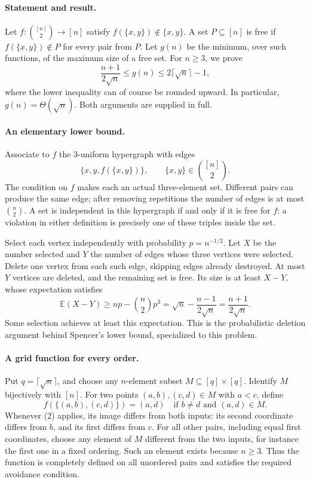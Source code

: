 \paragraph{Statement and result.}
Let \(f:\binom{[n]}2\to[n]\) satisfy \(f(\{x,y\})\notin\{x,y\}\). A set \(P\subseteq[n]\) is free if \(f(\{x,y\})\notin P\) for every pair from \(P\). Let \(g(n)\) be the minimum, over such functions, of the maximum size of a free set. For \(n\geq3\), we prove
\[
 \frac{n+1}{2\sqrt n}\leq g(n)\leq2\lceil\sqrt n\rceil-1,
\]
where the lower inequality can of course be rounded upward. In particular, \(g(n)=\Theta(\sqrt n)\). Both arguments are supplied in full.

\paragraph{An elementary lower bound.}
Associate to \(f\) the 3-uniform hypergraph with edges
\[
 \{x,y,f(\{x,y\})\},\qquad \{x,y\}\in\binom{[n]}2.
\]
The condition on \(f\) makes each an actual three-element set. Different pairs can produce the same edge; after removing repetitions the number of edges is at most \(\binom n2\).
A set is independent in this hypergraph if and only if it is free for \(f\): a violation in either definition is precisely one of these triples inside the set.

Select each vertex independently with probability \(p=n^{-1/2}\). Let \(X\) be the number selected and \(Y\) the number of edges whose three vertices were selected. Delete one vertex from each such edge, skipping edges already destroyed. At most \(Y\) vertices are deleted, and the remaining set is free. Its size is at least \(X-Y\), whose expectation satisfies
\[
 \mathbb E(X-Y)\geq np-\binom n2p^3
 =\sqrt n-\frac{n-1}{2\sqrt n}
 =\frac{n+1}{2\sqrt n}. \tag{1}
\]
Some selection achieves at least this expectation. This is the probabilistic deletion argument behind Spencer's lower bound, specialized to this problem.

\paragraph{A grid function for every order.}
Put \(q=\lceil\sqrt n\rceil\), and choose any \(n\)-element subset \(M\subseteq[q]\times[q]\). Identify \(M\) bijectively with \([n]\).
For two points \((a,b),(c,d)\in M\) with \(a<c\), define
\[
 f(\{(a,b),(c,d)\})=(a,d)
 \quad\text{if }b\ne d\text{ and }(a,d)\in M. \tag{2}
\]
Whenever (2) applies, its image differs from both inputs: its second coordinate differs from \(b\), and its first differs from \(c\). For all other pairs, including equal first coordinates, choose any element of \(M\) different from the two inputs, for instance the first one in a fixed ordering. Such an element exists because \(n\geq3\). Thus the function is completely defined on all unordered pairs and satisfies the required avoidance condition.

